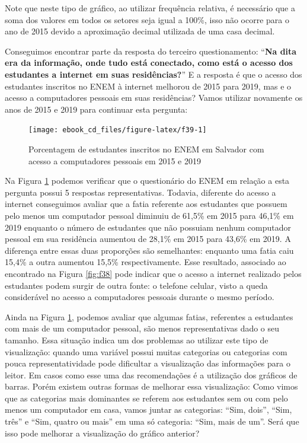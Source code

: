 \documentclass[
  portuguese,
  oneside]{book}
\begin{document}
Note que neste tipo de gráfico, ao utilizar frequência relativa, é necessário que a soma dos valores em todos os setores seja igual a 100\%, isso não ocorre para o ano de 2015 devido a aproximação decimal utilizada de uma casa decimal.

Conseguimos encontrar parte da resposta do terceiro questionamento: ``\textbf{Na dita era da informação, onde tudo está conectado, como está o acesso dos estudantes a internet em suas residências?}'' E a resposta é que o acesso dos estudantes inscritos no ENEM à internet melhorou de 2015 para 2019, mas e o acesso a computadores pessoais em suas residências? Vamos utilizar novamente os anos de 2015 e 2019 para continuar esta pergunta:

\begin{figure}

{\centering \texttt{[image: ebook\_cd\_files/figure-latex/f39-1]} 

}

\caption{Porcentagem de estudantes inscritos no ENEM em Salvador com acesso a computadores pessoais em 2015 e 2019}\label{fig:f39}
\end{figure}

Na Figura \ref{fig:f39} podemos verificar que o questionário do ENEM em relação a esta pergunta possui 5 respostas representativas. Todavia, diferente do acesso a internet conseguimos avaliar que a fatia referente aos estudantes que possuem pelo menos um computador pessoal diminuiu de 61,5\% em 2015 para 46,1\% em 2019 enquanto o número de estudantes que não possuiam nenhum computador pessoal em sua residência aumentou de 28,1\% em 2015 para 43,6\% em 2019. A diferença entre essas duas proporções são semelhantes: enquanto uma fatia caiu 15,4\% a outra aumentou 15,5\% respectivamente. Esse resultado, associado ao encontrado na Figura \ref{fig:f38} pode indicar que o acesso a internet realizado pelos estudantes podem surgir de outra fonte: o telefone celular, visto a queda considerável no acesso a computadores pessoais durante o mesmo período.

Ainda na Figura \ref{fig:f39}, podemos avaliar que algumas fatias, referentes a estudantes com mais de um computador pessoal, são menos representativas dado o seu tamanho. Essa situação indica um dos problemas ao utilizar este tipo de visualização: quando uma variável possui muitas categorias ou categorias com pouca representatividade pode dificultar a visualização das informações para o leitor. Em casos como esse uma das recomendações é a utilização dos gráficos de barras. Porém existem outras formas de melhorar essa visualização: Como vimos que as categorias mais dominantes se referem aos estudantes sem ou com pelo menos um computador em casa, vamos juntar as categorias: ``Sim, dois'', ``Sim, três'' e ``Sim, quatro ou mais'' em uma só categoria: ``Sim, mais de um''. Será que isso pode melhorar a visualização do gráfico anterior?
\end{document}
